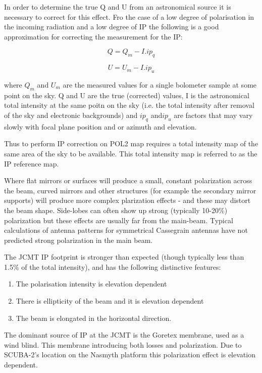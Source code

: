 In order to determine the true Q and U from an astronomical source it is necessary to correct
for this effect. Fro the case of a low degree of polarisation in the incoming radiation and a low 
degree of IP the following is a good approximation for correcting the measurement for the IP:

\begin{equation}
Q = Q_{m} - I. ip_{q}
\end{equation}

\begin{equation}
U = U_{m} - I. ip_{u}
\end{equation}

where $Q_{m}$ and $U_{m}$ are the measured values for a single bolometer sample at 
some point on the sky. Q and U are the true (corrected) values, I is the astronomical 
total intensity at the same poitn on the sky (i.e. the total intensity after removal of 
the sky and electronic backgrounds) and $ip_{q}$  and$ip_{u}$  are factors that may vary 
slowly with focal plane position and or azimuth and elevation.

Thus to perform IP correction on POL2 map requires a total intensity map of the same area
of the sky to be available. This total intensity map is referred to as the IP reference map. 

Where flat mirrors or surfaces will produce a small, constant polarization across the beam, 
curved mirrors and other structures (for example the secondary mirror supports) will 
produce more complex plarization effects - and these may distort the beam shape. 
Side-lobes can often show up strong (typically 10-20\%) polarization but these 
effects are usually far from the main-beam. Typical calculations of antenna patterns 
for symmetrical Cassegrain antennas have not predicted strong polarization in the main beam.

The JCMT IP footprint is stronger than expected (though typically less than 1.5\% of 
the total intensity), and has the following distinctive features:

\begin{enumerate}\itemsep-0.2em
\item The polarisation intensity is elevation dependent
\item There is ellipticity of the beam and it is elevation dependent
\item The beam is elongated in the horizontal direction.
\end{enumerate}

The dominant source of IP at the JCMT is the Goretex membrane, used as a wind blind. 
This membrane introducing both losses and polarization. Due to SCUBA-2's location
on the Nasmyth platform this polarization effect is elevation dependent.


